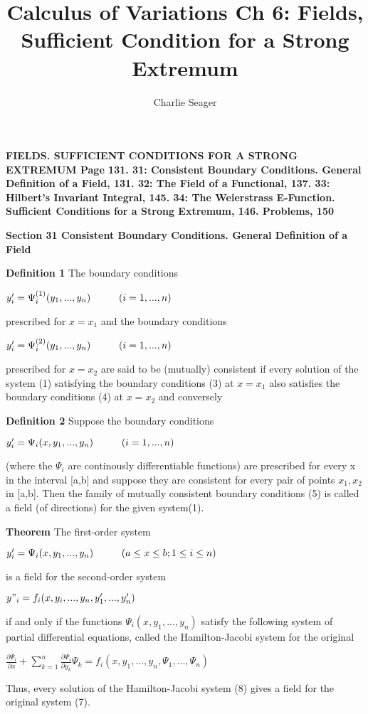 \documentclass{article}
\newcommand\tab[1][1cm]{\hspace*{#1}}
\begin{document}
\title {Calculus of Variations Ch 6: Fields, Sufficient Condition for a Strong Extremum}

\author{Charlie Seager}

\maketitle

\textbf {FIELDS. SUFFICIENT CONDITIONS FOR A STRONG
EXTREMUM Page 131. 31: Consistent Boundary Conditions. General Definition of a Field, 131. 32: The
Field of a Functional, 137. 33: Hilbert's Invariant Integral, 145. 34: The Weierstrass E-Function. Sufficient
Conditions for a Strong Extremum, 146. Problems, 150}

\textbf {Section 31 Consistent Boundary Conditions. General Definition of a Field}

\textbf {Definition 1} The boundary conditions
\begin{center}
$y'_i = \Psi_i^{(1)}(y_1 ,..., y_n) \tab (i = 1,..., n)$
\end{center}
prescribed for $x = x_1$ and the boundary conditions
\begin{center}
$y'_i = \Psi_i^{(2)}(y_1,...,y_n) \tab (i = 1,...,n)$
\end{center}
prescribed for $x = x_2$ are said to be (mutually) consistent if every solution of the system (1) satisfying the boundary conditions (3) at $x = x_1$ also satisfies the boundary conditions (4) at $x = x_2$ and conversely

\textbf {Definition 2} Suppose the boundary conditions
\begin{center}
$y'_i = \Psi_i(x, y_1,...,y_n) \tab (i = 1,...,n)$
\end{center}
(where the $\Psi_i$ are continously differentiable functions) are prescribed for every x in the interval [a,b] and suppose they are consistent for every pair of points $x_1, x_2$ in [a,b]. Then the family of mutually consistent boundary conditions (5) is called a field (of directions) for the given system(1).

\textbf {Theorem} The first-order system
\begin{center}
$y'_i = \Psi_i(x, y_1 ,..., y_n) \tab (a \leq x \leq b; 1 \leq i \leq n)$
\end{center}
is a field for the second-order system
\begin{center}
$y"_i = f_i(x, y_i ,..., y_n, y'_1 ,..., y'_n)$
\end{center}
if and only if the functions $\Psi_i(x, y_1, ..., y_n)$ satisfy the following system of partial differential equations, called the Hamilton-Jacobi system for the original
\begin{center}
$\frac{\partial \Psi_i}{\partial x} + \sum_{k =1}^n \frac{\partial \Psi_i}{\partial y_k} \Psi_k = f_i (x, y_1,..., y_n, \Psi_1,..., \Psi_n)$
\end{center}
Thus, every solution of the Hamilton-Jacobi system (8) gives a field for the original system (7).
\end{document}
